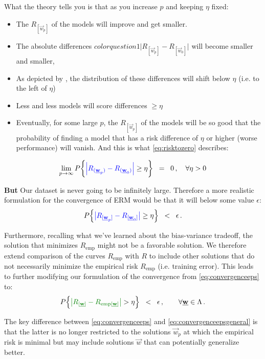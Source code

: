 \begin{frame}
{\begin{itemize}
			What the theory tells you is that as you increase $p$ and keeping $\eta$ fixed:
			\begin{itemize}
				\item The $R_{[\vec w_p]}$ of the models will improve and get smaller.
				\item The absolute differences ${color{question1}\Big|R_{[\vec w_p]} - R_{[\vec w_0]}\Big|}$ will become smaller and smaller,
				\item As depicted by , the distribution of these differences will shift below $\eta$ (i.e. to the left of $\eta$)
				\item Less and less models will score differences $\ge \eta$
				\item Eventually, for some large $p$, the $R_{[\vec w_p]}$ of the models will be so good that the probability of finding a model that has a risk difference of $\eta$ or higher (worse performance) will vanish. And this is what \eqref{eq:risktozero} describes:
			\end{itemize}
			\end{itemize}
			\begin{equation}
				\lim_{p \to \infty} P\bigg\{ 
					{\color{question1}
						\Big|R_{(\vec w_p)} - R_{(\vec w_0)}\Big| 
					}
				\geq \eta \bigg\}\;\;=\;\; 0 \,, \quad \forall \eta > 0
				\label{eq:risktozero}
			\end{equation}
			
			\textbf{But} Our dataset is never going to be infinitely large. Therefore a more realistic formulation for the convergence of ERM would be that it will below some value $\epsilon$:
			\begin{equation}
					P \Big\{ {\color{question1} 
							\big| R_{[\vec{w}_p]} - R_{[\vec{w}_0]} \big| 
						} \geq \eta \Big\} \;\;<\;\; \epsilon \,.
						\label{eq:convergenceeps}
				\end{equation}
				
			Furthermore, recalling what we've learned about the bias-variance tradeoff, the solution that minimizes $R_{\text{emp}}$ might not be a favorable solution. We therefore extend comparison of the curves $R_{\text{emp}}$ with $R$ to include other solutions that do not necessarily minimize the empirical risk $R_{\text{emp}}$ (i.e. training error). This leads to further modifying our formulation of the convergence from \eqref{eq:convergenceeps} to:
				\begin{equation}
					P \Big\{ {\color{question2}
							\big| R_{[\vec w]} - R_{\mathrm{emp}[\vec w]} \big|
						} > \eta \Big\} \;\;<\;\; \epsilon \,, 
						\qquad \forall \vec w \in \Lambda \,.
						\label{eq:convergenceepsgeneral}
				\end{equation}
			
			The key difference between \eqref{eq:convergenceeps} and \eqref{eq:convergenceepsgeneral} is that the latter is no longer restricted to the solutions $\vec w_p$ at which the empirical risk is minimal but may include solutions $\vec w$ that can potentially generalize better.
}
\end{frame}
